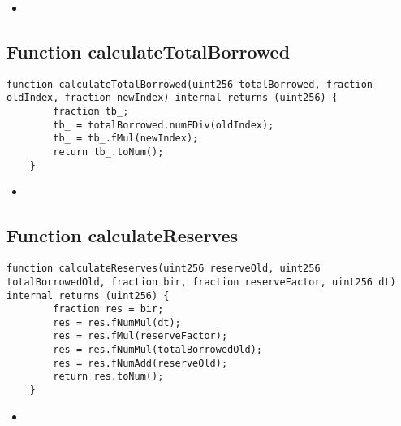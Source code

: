 \noindent\begin{itemize}
  \item {}
\end{itemize}


\subsection{Function calculateTotalBorrowed}

\begin{lstlisting}[firstnumber=45]
    function calculateTotalBorrowed(uint256 totalBorrowed, fraction oldIndex, fraction newIndex) internal returns (uint256) {
        fraction tb_;
        tb_ = totalBorrowed.numFDiv(oldIndex);
        tb_ = tb_.fMul(newIndex);
        return tb_.toNum();
    }
\end{lstlisting}

\noindent\begin{itemize}
  \item {}
\end{itemize}


\subsection{Function calculateReserves}

\begin{lstlisting}[firstnumber=52]
    function calculateReserves(uint256 reserveOld, uint256 totalBorrowedOld, fraction bir, fraction reserveFactor, uint256 dt) internal returns (uint256) {
        fraction res = bir;
        res = res.fNumMul(dt);
        res = res.fMul(reserveFactor);
        res = res.fNumMul(totalBorrowedOld);
        res = res.fNumAdd(reserveOld);
        return res.toNum();
    }
\end{lstlisting}

\noindent\begin{itemize}
  \item {}
\end{itemize}
